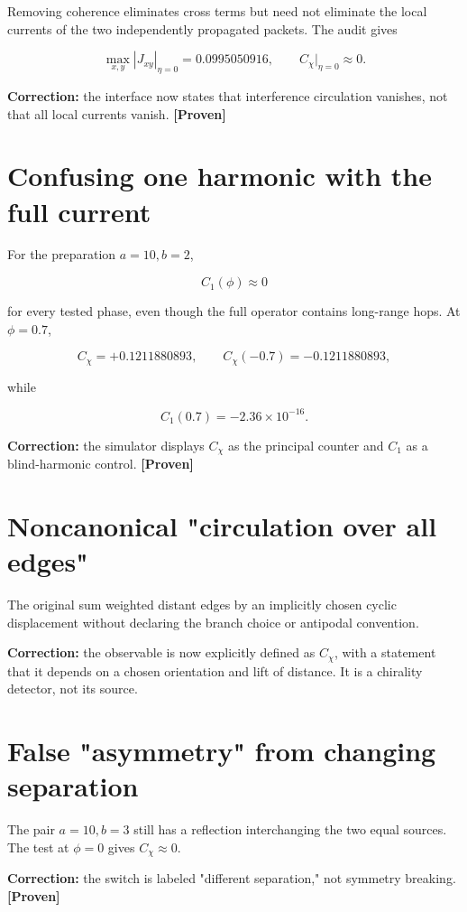 \documentclass[11pt,a4paper,openany]{report}
\newcommand{\statusProven}{\textcolor{fingreen}{[Proven]}}
\begin{document}
Removing coherence eliminates cross terms but need not eliminate the local currents of the two independently propagated packets. The audit gives

\[
\max_{x,y}|J_{xy}|_{\eta=0}=0.0995050916,
\qquad
C_\chi|_{\eta=0}\approx0.
\]

\textbf{Correction:} the interface now states that interference circulation vanishes, not that all local currents vanish. \textbf{\statusProven{}}

\section{Confusing one harmonic with the full current}

For the preparation \(a=10,b=2\),

\[
C_1(\phi)\approx0
\]

for every tested phase, even though the full operator contains long-range hops. At \(\phi=0.7\),

\[
C_\chi=+0.1211880893,\qquad
C_\chi(-0.7)=-0.1211880893,
\]

while

\[
C_1(0.7)=-2.36\times10^{-16}.
\]

\textbf{Correction:} the simulator displays \(C_\chi\) as the principal counter and \(C_1\) as a blind-harmonic control. \textbf{\statusProven{}}

\section{Noncanonical "circulation over all edges"}

The original sum weighted distant edges by an implicitly chosen cyclic displacement without declaring the branch choice or antipodal convention.

\textbf{Correction:} the observable is now explicitly defined as \(C_\chi\), with a statement that it depends on a chosen orientation and lift of distance. It is a chirality detector, not its source.

\section{False "asymmetry" from changing separation}

The pair \(a=10,b=3\) still has a reflection interchanging the two equal sources. The test at \(\phi=0\) gives \(C_\chi\approx0\).

\textbf{Correction:} the switch is labeled "different separation," not symmetry breaking. \textbf{\statusProven{}}
\end{document}
